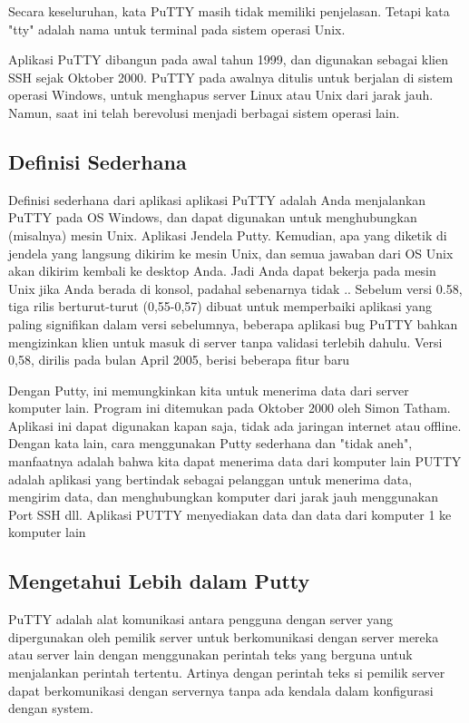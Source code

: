 Secara keseluruhan, kata PuTTY masih tidak memiliki penjelasan. Tetapi kata "tty" adalah nama untuk terminal pada sistem operasi Unix.

Aplikasi PuTTY dibangun pada awal tahun 1999, dan digunakan sebagai klien SSH sejak Oktober 2000. PuTTY pada awalnya ditulis untuk berjalan di sistem operasi Windows, untuk menghapus server Linux atau Unix dari jarak jauh. Namun, saat ini telah berevolusi menjadi berbagai sistem operasi lain.


\subsection { Definisi Sederhana }

Definisi sederhana dari aplikasi aplikasi PuTTY adalah Anda menjalankan PuTTY pada OS Windows, dan dapat digunakan untuk menghubungkan (misalnya) mesin Unix. Aplikasi Jendela Putty. Kemudian, apa yang diketik di jendela yang langsung dikirim ke mesin Unix, dan semua jawaban dari OS Unix akan dikirim kembali ke desktop Anda. Jadi Anda dapat bekerja pada mesin Unix jika Anda berada di konsol, padahal sebenarnya tidak ..
Sebelum versi 0.58, tiga rilis berturut-turut (0,55-0,57) dibuat untuk memperbaiki aplikasi yang paling signifikan dalam versi sebelumnya, beberapa aplikasi bug PuTTY bahkan mengizinkan klien untuk masuk di server tanpa validasi terlebih dahulu. Versi 0,58, dirilis pada bulan April 2005, berisi beberapa fitur baru

Dengan Putty, ini memungkinkan kita untuk menerima data dari server komputer lain. Program ini ditemukan pada Oktober 2000 oleh Simon Tatham. Aplikasi ini dapat digunakan kapan saja, tidak ada jaringan internet atau offline. Dengan kata lain, cara menggunakan Putty sederhana dan "tidak aneh", manfaatnya adalah bahwa kita dapat menerima data dari komputer lain PUTTY adalah aplikasi yang bertindak sebagai pelanggan untuk menerima data, mengirim data, dan menghubungkan komputer dari jarak jauh menggunakan Port SSH dll. Aplikasi PUTTY menyediakan data dan data dari komputer 1 ke komputer lain


\subsection {Mengetahui Lebih dalam Putty}

PuTTY adalah alat komunikasi antara pengguna dengan server yang dipergunakan oleh pemilik server untuk berkomunikasi dengan server mereka atau server lain dengan menggunakan perintah teks yang berguna untuk menjalankan perintah tertentu. Artinya dengan perintah teks si pemilik server dapat berkomunikasi dengan servernya tanpa ada kendala dalam konfigurasi dengan system.

